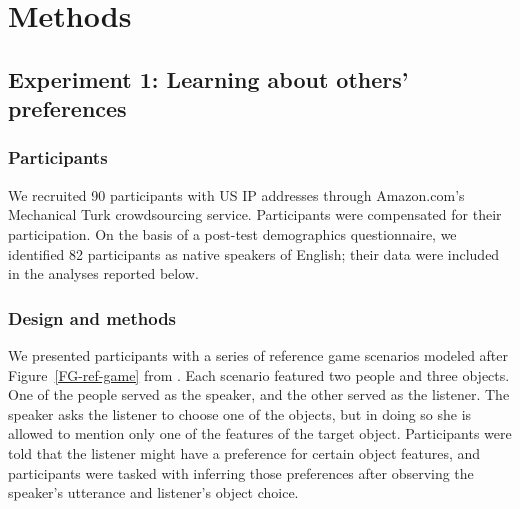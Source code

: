 \documentclass[10pt,a4paper]{article}
\begin{document}

\section*{Methods}


\subsection*{Experiment 1: Learning about others' preferences}

\subsubsection*{Participants}

We recruited 90 participants with US IP addresses through Amazon.com's Mechanical Turk crowdsourcing service. Participants were compensated for their participation. On the basis of a post-test demographics questionnaire, we identified 82 participants as native speakers of English; their data were included in the analyses reported below.

\subsubsection*{Design and methods}

We presented participants with a series of reference game scenarios modeled after Figure~\ref{FG-ref-game} from .
Each scenario featured two people and three objects.
One of the people served as the speaker, and the other served as the listener. The speaker asks the listener to choose one of the objects, but in doing so she is allowed to mention only one of the features of the target object. Participants were told that the listener might have a preference for certain object features, and participants were tasked with inferring those preferences after observing the speaker's utterance and listener's object choice.
\end{document}
